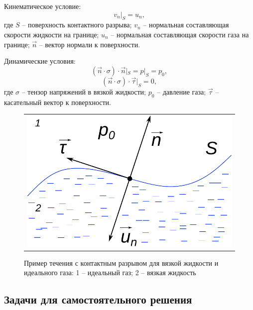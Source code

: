 \documentclass[a4paper, 14pt]{extarticle}
\begin{document}
\alert{Кинематическое} условие:
\[
v_n|_S = u_n,
\]
где $S$ -- поверхность контактного разрыва; $v_n$ -- нормальная составляющая скорости жидкости на границе; $u_n$ -- нормальная составляющая скорости газа на границе; $\vec{n}$ -- вектор нормали к поверхности.

\alert{Динамические} условия:
\[
(\vec{n}\cdot\sigma)\cdot\vec{n}|_S= p|_S = p_0,
\]
\[
(\vec{n}\cdot\sigma)\cdot\vec{\tau}|_S = 0,
\]
где $\sigma$ -- тензор напряжений в вязкой жидкости; $p_0$ -- давление газа; $\vec{\tau}$ -- касательный вектор к поверхности.

\begin{figure}
	\centering
	\begin{tabular}{c}
		\includegraphics[width=0.6\linewidth]{../img/free_bound} \\
	\end{tabular}
	\caption{Пример течения с контактным разрывом для вязкой жидкости и идеального газа: 1 -- идеальный газ; 2 -- вязкая жидкость}
	\label{fig:viscous_fluid_gas}
	
\end{figure}	



\subsection{Задачи для самостоятельного решения}
\end{document}
